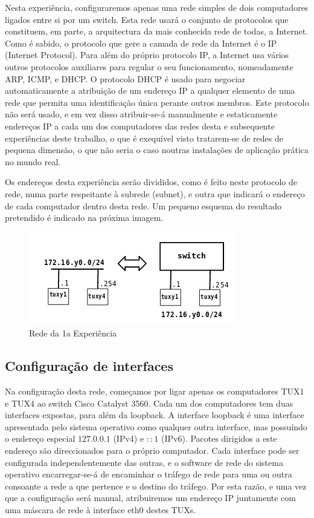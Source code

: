 \documentclass[a4paper,11pt,titlepage]{article}
\begin{document}
Nesta experiência, configuraremos apenas uma rede simples de dois computadores
ligados entre si por um switch. Esta rede usará o conjunto de protocolos que
constituem, em parte, a arquitectura da mais conhecida rede de todas, a
Internet. Como é sabido, o protocolo que gere a camada de rede da Internet é
o IP (Internet Protocol).  Para além do próprio protocolo IP, a Internet usa
vários outros protocolos auxiliares para regular o seu funcionamento,
nomeadamente ARP, ICMP, e DHCP.
O protocolo DHCP é usado para negociar automaticamente a atribuição de um
endereço IP a qualquer elemento de uma rede que permita uma identificação única
perante outros membros. Este protocolo não será usado, e em vez disso
atribuir-se-á manualmente e estaticamente endereços IP a cada um dos
computadores das redes desta e subsequente experiências deste trabalho, o que é
exequível visto tratarem-se de redes de pequena dimensão, o que não seria o
caso noutras instalações de aplicação prática no mundo real.

Os endereços desta experiência serão divididos, como é feito neste protocolo de
rede, numa parte respeitante à subrede (subnet), e outra que indicará o
endereço de cada computador dentro desta rede. Um pequeno esquema do resultado
pretendido é indicado na próxima imagem.

\begin{figure}[H]
    \center
    \includegraphics[scale=0.45]{res/network1.png}
    \caption{Rede da 1a Experiência}
    \label{fig:network1.png}
\end{figure}

\subsection{Configuração de interfaces}

Na configuração desta rede, começamos por ligar apenas os computadores TUX1 e
TUX4 ao switch Cisco Catalyst 3560. Cada um dos computadores tem duas
interfaces expostas, para além da loopback.
A interface loopback é uma interface apresentada pelo sistema operativo como
qualquer outra interface, mas possuíndo o endereço especial $127.0.0.1$
(IPv4) e $::1$ (IPv6). Pacotes dirigidos a este endereço são direccionados para o
próprio computador.
Cada interface pode ser configurada independentemente das outras, e o software
de rede do sistema operativo encarregar-se-á de encaminhar o tráfego de rede
para uma ou outra consoante a rede a que pertence e o destino do tráfego. Por esta razão, e uma vez que a configuração será manual, atribuiremos um endereço IP
juntamente com uma máscara de rede à interface eth0 destes TUXs.
\end{document}
